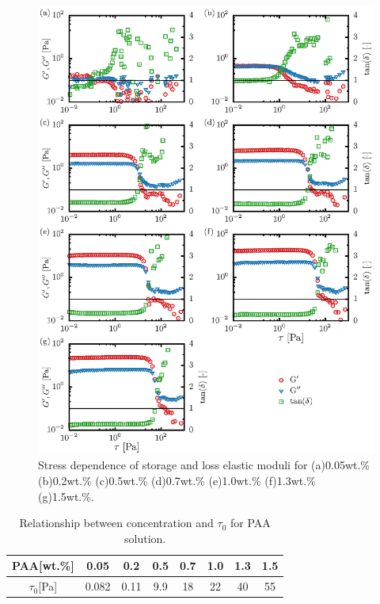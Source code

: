 \begin{figure}[ht]
	\centering
	\includegraphics[clip]{3-Physical_Property/elastic_modulus.eps}
	\caption{Stress dependence of storage and loss elastic moduli for (a)0.05wt.\% (b)0.2wt.\% (c)0.5wt.\% (d)0.7wt.\% (e)1.0wt.\% (f)1.3wt.\% (g)1.5wt.\%.}
	\label{fig:PAA-elast}
\end{figure}

\begin{table}[h]
	\centering
	\caption{Relationship between concentration and $\tau_0$ for PAA solution.}
	\label{table:PAA-tau0}
	\begin{tabular}{c|c|c|c|c|c|c|c} \hline
		PAA[wt.\%]   & 0.05  & 0.2  & 0.5 & 0.7 & 1.0 & 1.3 & 1.5 \\ \hline \hline
		$\tau_0$[Pa] & 0.082 & 0.11 & 9.9 & 18  & 22  & 40  & 55  \\ \hline
	\end{tabular}
\end{table}

